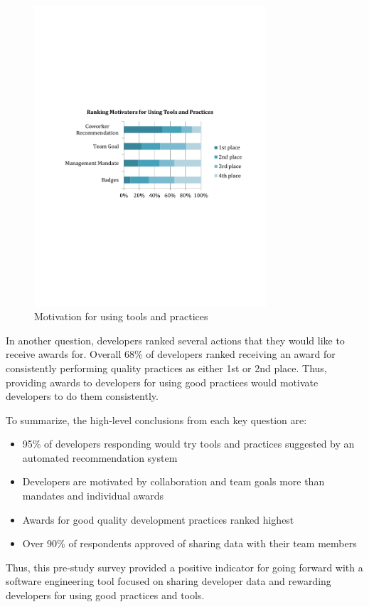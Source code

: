 \documentclass{sig-alternate}
\begin{document}
\begin{figure}
	\includegraphics[width=3.4in]{ToolAndPracticeMotivators.pdf}
	\caption{Motivation for using tools and practices}
	\label{fig:toolandpracticemotivators}
\end{figure}

In another question, developers ranked several actions that they would like to receive awards for.  Overall 68\% of developers ranked receiving an award for consistently performing quality practices as either 1st or 2nd place.  Thus, providing awards to developers for using good practices would motivate developers to do them consistently.

 To summarize, the high-level conclusions from each key question are:
\begin{itemize}[itemsep=0mm]
\item 95\% of developers responding would try tools and practices suggested by an automated recommendation system 
\item Developers are motivated by collaboration and team goals more than mandates and individual awards
\item Awards for good quality development practices ranked highest
\item Over 90\% of respondents approved of sharing data with their team members
\end{itemize}
Thus, this pre-study survey provided a positive indicator for going forward with a software engineering tool focused on sharing developer data and rewarding developers for using good practices and tools. 
\end{document}
